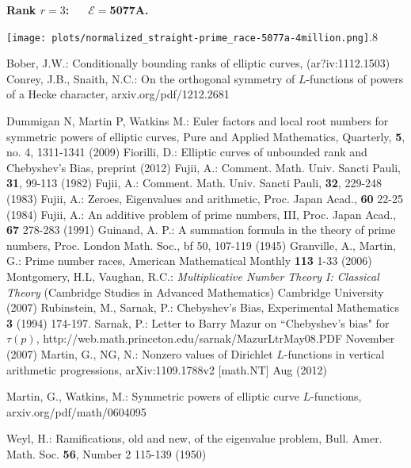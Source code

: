 \documentclass[11pt]{article}
\theoremstyle{plain}
\theoremstyle{definition}
\numberwithin{equation}{section}
\numberwithin{figure}{section}
\numberwithin{table}{section}
\begin{document}
   \vskip60pt


  \centerline{\bf Rank $r=3$:\ \ \  ${\mathcal E}=$5077A.}




     \texttt{[image: plots/normalized\_straight-prime\_race-5077a-4million.png]}{.8}~\label{nr389}







\begin{thebibliography}{bib}
 \label{B} Bober, J.W.: Conditionally bounding ranks of elliptic curves, (ar?iv:1112.1503)
 \label{C-S} Conrey, J.B., Snaith, N.C.:  On the orthogonal symmetry of $L$-functions of powers of a Hecke character, arxiv.org/pdf/1212.2681


 \label{DMW} Dummigan N, Martin P, Watkins M.: Euler factors and local root numbers for symmetric powers of elliptic curves, Pure and Applied Mathematics, Quarterly, {\bf 5},  no. 4, 1311-1341  (2009)
  \label{F}  Fiorilli, D.: Elliptic curves of unbounded rank and Chebyshev's Bias, preprint (2012)
        \label{Fu1} Fujii, A.:  Comment. Math. Univ. Sancti Pauli, {\bf 31}, 99-113 (1982)
        \label{Fu2} Fujii, A.:  Comment. Math. Univ. Sancti Pauli, {\bf 32}, 229-248 (1983)
      \label{Fu3} Fujii, A.: Zeroes, Eigenvalues and arithmetic, Proc. Japan Acad., {\bf 60} 22-25 (1984)
    \label{Fu4} Fujii, A.: An additive problem of prime numbers, III, Proc. Japan Acad., {\bf 67} 278-283 (1991)
   \label{G} Guinand, A. P.: A summation formula in the theory of prime numbers, Proc. London Math. Soc., {bf 50}, 107-119 (1945)
 \label{GM}  Granville, A., Martin, G.:  Prime number races,
American Mathematical Monthly {\bf 113} 1-33 (2006)
  \label{MV} Montgomery, H.L, Vaughan, R.C.:   {\it Multiplicative Number Theory I: Classical Theory} (Cambridge Studies in Advanced Mathematics) Cambridge University (2007)
  \label{R-S}   Rubinstein, M., Sarnak, P.: Chebyshev's Bias,  Experimental  Mathematics {\bf 3}  (1994) 174-197.
    \label{S} Sarnak, P.: Letter to Barry Mazur on ``Chebyshev's bias" for $\tau(p)$, http://web.math.princeton.edu/sarnak/MazurLtrMay08.PDF  November (2007)
  \label{M-N} Martin, G., NG, N.: Nonzero values of Dirichlet $L$-functions in vertical arithmetic progressions,
    arXiv:1109.1788v2 [math.NT]  Aug (2012)

        \label{M-W} Martin, G., Watkins, M.:  Symmetric powers of elliptic curve $L$-functions, arxiv.org/pdf/math/0604095

     \label{W}  Weyl, H.:  Ramifications, old and new, of the eigenvalue problem,  Bull. Amer. Math. Soc. {\bf 56}, Number 2 115-139 (1950)
\end{thebibliography}
\end{document}
